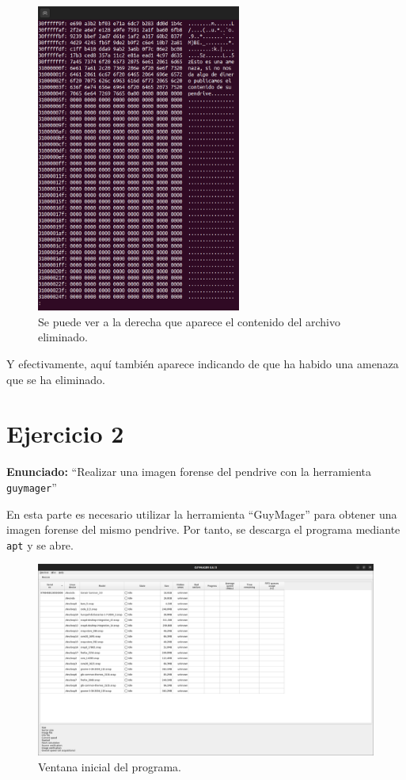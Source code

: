 \documentclass{article}
\begin{document}
\begin{figure}[H]
    \centering
    \includegraphics[width=0.6\textwidth]{imagenes/Captura desde 2022-12-03 21-39-24.png}
    \caption{Se puede ver a la derecha que aparece el contenido del archivo eliminado.}
\end{figure}

Y efectivamente, aquí también aparece indicando de que ha habido una amenaza que se ha eliminado.

\newpage

\section{Ejercicio 2}

\textbf{Enunciado: }``Realizar una imagen forense del  pendrive con la herramienta \verb|guymager|''

\bigskip

En esta parte es necesario utilizar la herramienta ``GuyMager'' para obtener una imagen forense del mismo pendrive. Por tanto, se descarga el programa mediante \verb|apt| y se abre.

\begin{figure}[H]
    \centering
    \includegraphics[width=\textwidth]{imagenes/Captura desde 2022-12-02 19-33-30.png}
    \caption{Ventana inicial del programa.}
\end{figure}
\end{document}
